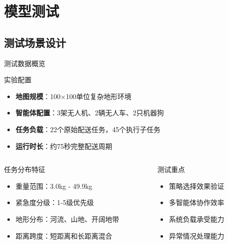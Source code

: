\documentclass[
10pt,
aspectratio=169,
]{beamer}
\begin{document}
\section{模型测试}

\subsection{测试场景设计}

\begin{frame}{测试数据概览}
    \begin{block}{实验配置}
        \begin{itemize}
            \item \textbf{地图规模}：100×100单位复杂地形环境
            \item \textbf{智能体配置}：3架无人机、2辆无人车、2只机器狗
            \item \textbf{任务负载}：22个原始配送任务，45个执行子任务
            \item \textbf{运行时长}：约75秒完整配送周期
        \end{itemize}
    \end{block}
    
    \begin{columns}
        \begin{column}{0.5\textwidth}
            \begin{exampleblock}{任务分布特征}
                \begin{itemize}
                    \item 重量范围：3.0kg - 49.9kg
                    \item 紧急度分级：1-5级优先级
                    \item 地形分布：河流、山地、开阔地带
                    \item 距离跨度：短距离和长距离混合
                \end{itemize}
            \end{exampleblock}
        \end{column}
        \begin{column}{0.5\textwidth}
            \begin{alertblock}{测试重点}
                \begin{itemize}
                    \item 策略选择效果验证
                    \item 多智能体协作效率
                    \item 系统负载承受能力
                    \item 异常情况处理能力
                \end{itemize}
            \end{alertblock}
        \end{column}
    \end{columns}
\end{frame}
\end{document}
